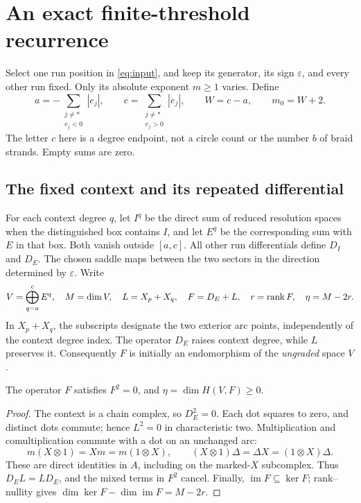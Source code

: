 \section{An exact finite-threshold recurrence}\label{sec:recurrence}

Select one run position in \eqref{eq:input}, and keep its generator,
its sign \(\varepsilon\), and every other run fixed. Only its absolute
exponent \(m\ge1\) varies. Define
\begin{equation}\label{eq:context-span}
a=-\sum_{\substack{j\ne *\\e_j<0}}|e_j|,\qquad
c=\sum_{\substack{j\ne *\\e_j>0}}|e_j|,\qquad
W=c-a,\qquad m_0=W+2.
\end{equation}
The letter \(c\) here is a degree endpoint, not a circle count or the
number \(b\) of braid strands. Empty sums are zero.

\subsection{The fixed context and its repeated differential}

For each context degree \(q\), let \(I^q\) be the direct sum of reduced
resolution spaces when the distinguished box contains \(I\), and let
\(E^q\) be the corresponding sum with \(E\) in that box. Both vanish
outside \([a,c]\). All other run differentials define \(D_I\) and \(D_E\).
The chosen saddle maps between the two sectors in the direction determined
by \(\varepsilon\). Write
\begin{equation}\label{eq:context-space}
V=\bigoplus_{q=a}^{c}E^q,\quad M=\dim V,\quad
L=X_p+X_q,\quad F=D_E+L,\quad
r=\operatorname{rank} F,\quad \eta=M-2r.
\end{equation}
In \(X_p+X_q\), the subscripts designate the two exterior arc points,
independently of the context degree index.
The operator \(D_E\) raises context degree, while \(L\) preserves it.
Consequently \(F\) is initially an endomorphism of the \emph{ungraded}
space \(V\).

\begin{lemma}\label{lem:square-zero}
The operator \(F\) satisfies \(F^2=0\), and
\(\eta=\dim H(V,F)\ge0\).
\end{lemma}

\begin{proof}
The context is a chain complex, so \(D_E^2=0\). Each dot squares to zero,
and distinct dots commute; hence \(L^2=0\) in characteristic two.
Multiplication and comultiplication commute with a dot on an unchanged
arc:
\[
m(X\otimes1)=Xm=m(1\otimes X),\qquad
(X\otimes1)\Delta=\Delta X=(1\otimes X)\Delta.
\]
These are direct identities in \(A\), including on the marked-\(X\)
subcomplex. Thus \(D_EL=LD_E\), and the mixed terms in \(F^2\) cancel.
Finally, \(\operatorname{im}F\subseteq\ker F\); rank--nullity gives
\(\dim\ker F-\dim\operatorname{im}F=M-2r\).
\end{proof}

